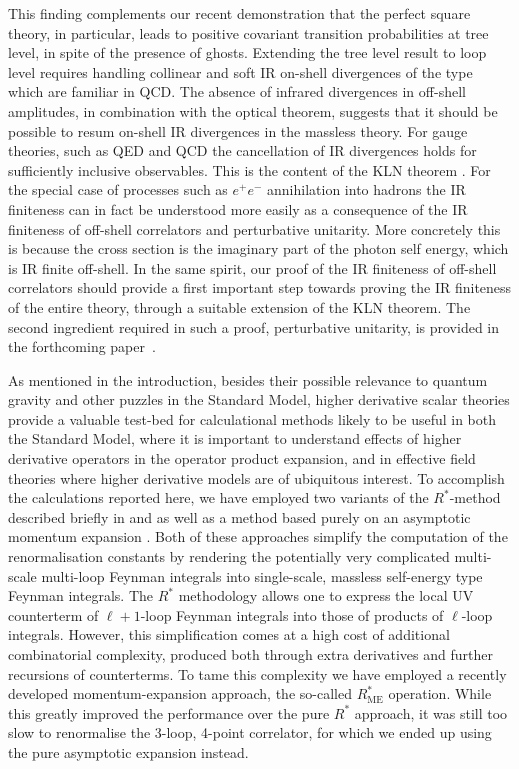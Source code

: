 \documentclass[a4paper,11pt]{article}
\begin{document}
This finding complements our recent demonstration that the perfect square theory, in particular, leads to positive covariant transition probabilities at tree level, in spite of the presence of ghosts. Extending the tree level result to loop level requires handling collinear and soft IR on-shell divergences of the type which are familiar in QCD. The absence of infrared divergences in off-shell amplitudes, in combination with the optical theorem, suggests that it should be possible to resum on-shell IR divergences in the massless theory. For gauge theories, such as QED and QCD the cancellation of IR divergences holds for sufficiently inclusive observables. This is the content of the KLN theorem \cite{Kinoshita:1962ur, PhysRev.133.B1549,Poggio:1976qr, Sterman:1976jh, Frye:2018xjj}. For the special case of processes such as $e^+e^-$ annihilation into hadrons the IR finiteness can in fact be understood more easily \cite{Sterman:1993hfp} as a consequence of the IR finiteness of off-shell correlators and perturbative unitarity. More concretely this is because the cross section is the imaginary part of the photon self energy, which is IR finite off-shell. In the same spirit, our proof of the IR finiteness of off-shell correlators should provide a first important step towards proving the IR finiteness of the entire theory, through a suitable extension of the KLN theorem. The second ingredient required in such a proof, perturbative unitarity, is provided in the forthcoming paper~\cite{Bateman:2026positivity}. 

As mentioned in the introduction, besides their possible relevance to quantum gravity and other puzzles in the Standard Model, higher derivative scalar theories provide a valuable test-bed for calculational methods likely to be useful in both the Standard Model, where it is important to understand effects of higher derivative operators in the operator product expansion, and in effective field theories where higher derivative models are of ubiquitous interest.    
To accomplish the calculations reported here, we have employed two variants of the $R^*$-method described briefly in \cite{deVries:2019nsu} and \cite{Henriksson:2025hwi} as well as a method based purely on an asymptotic momentum expansion \cite{VanThurenhout:2025vui,Falcioni:2024xav,Falcioni:2023luc,Falcioni:2023vqq,Falcioni:2024xyt,Falcioni:2024qpd}. 
Both of these approaches simplify the computation of the renormalisation constants by rendering the potentially very complicated multi-scale multi-loop Feynman integrals into single-scale, massless self-energy type Feynman integrals. The $R^*$ methodology allows one to express the local UV counterterm of $\ell+1$-loop Feynman integrals into those of products of $\ell$-loop integrals. However, this simplification comes at a high cost of additional combinatorial complexity, produced both through extra derivatives and further recursions of counterterms. To tame this complexity we have employed a recently developed momentum-expansion approach, the so-called $R^*_{\textrm{ME}}$ operation. While this greatly improved the performance over the pure $R^*$ approach, it was still too slow to renormalise the 3-loop, 4-point correlator, for which we ended up using the pure asymptotic expansion instead. 
\end{document}
